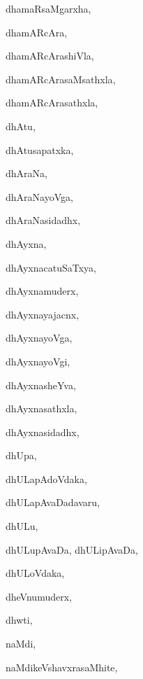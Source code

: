 \begin{multicols}{3}
{\noindent
{dhamaRsaMgarxha}, \pageref{dhamaRsaMgarxha}

\noindent
{dhamARcAra}, \pageref{dhamARcAra}

\noindent
{dhamARcArashiVla}, \pageref{dhamARcArashiVla}

\noindent
{dhamARcArasaMsathxla}, \pageref{dhamARcArasaMsathxla}

\noindent
{dhamARcArasathxla}, \pageref{dhamARcArasathxla}

\noindent
{dhAtu}, \pageref{dhAtu}

\noindent
{dhAtusapatxka}, \pageref{dhAtusapatxka}

\noindent
{dhAraNa}, \pageref{dhAraNa}

\noindent
{dhAraNayoVga}, \pageref{dhAraNayoVga}

\noindent
{dhAraNasidadhx}, \pageref{dhAraNasidadhx}

\noindent
{dhAyxna}, \pageref{dhAyxna}

\noindent
{dhAyxnacatuSaTxya}, \pageref{dhAyxnacatuSaTxya}

\noindent
{dhAyxnamuderx}, \pageref{dhAyxnamuderx}

\noindent
{dhAyxnayajacnx}, \pageref{dhAyxnayajacnx}

\noindent
{dhAyxnayoVga}, \pageref{dhAyxnayoVga}

\noindent
{dhAyxnayoVgi}, \pageref{dhAyxnayoVgi}

\noindent
{dhAyxnasheYva}, \pageref{dhAyxnasheYva}

\noindent
{dhAyxnasathxla}, \pageref{dhAyxnasathxla}

\noindent
{dhAyxnasidadhx}, \pageref{dhAyxnasidadhx}

\noindent
{dhUpa}, \pageref{dhUpa}

\noindent
{dhULapAdoVdaka}, \pageref{dhULapAdoVdaka}

\noindent
{dhULapAvaDadavaru}, \pageref{dhULapAvaDadavaru}

\noindent
{dhULu}, \pageref{dhULu}

\noindent
{dhULupAvaDa, dhULipAvaDa}, \pageref{dhULupAvaDa, dhULipAvaDa}

\noindent
{dhULoVdaka}, \pageref{dhULoVdaka}

\noindent
{dheVnumuderx}, \pageref{dheVnumuderx}

\noindent
{dhwti}, \pageref{dhwti}

\noindent
{naMdi}, \pageref{naMdi}

\noindent
{naMdikeVshavxrasaMhite}, \pageref{naMdikeVshavxrasaMhite}

}
\end{multicols}
